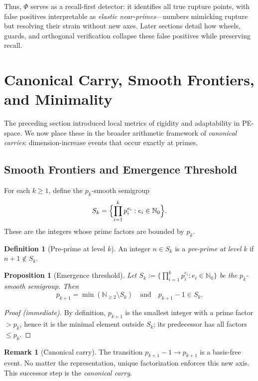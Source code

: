 \documentclass[11pt]{article}
\theoremstyle{plain}
\newtheorem{proposition}{Proposition}
\theoremstyle{definition}
\newtheorem{definition}{Definition}
\newtheorem{remark}{Remark}
\newcommand{\N}{\mathbb{N}}
\newcommand{\phidet}{\Phi}                                  %
\begin{document}
Thus, $\phidet$ serves as a recall-first detector: it identifies all true rupture points, with false positives interpretable as \emph{elastic near-primes}—numbers mimicking rupture but resolving their strain without new axes.  
Later sections detail how wheels, guards, and orthogonal verification collapse these false positives while preserving recall.

\section{Canonical Carry, Smooth Frontiers, and Minimality}

The preceding section introduced local metrics of rigidity and adaptability in PE-space. We now place these in the broader arithmetic framework of \emph{canonical carries}: dimension-increase events that occur exactly at primes.

\subsection{Smooth Frontiers and Emergence Threshold}
For each $k \geq 1$, define the $p_k$-smooth semigroup
\[
S_k = \Bigl\{ \prod_{i=1}^k p_i^{e_i} : e_i \in \N_0 \Bigr\}.
\]
These are the integers whose prime factors are bounded by $p_k$.  

\begin{definition}[Pre-prime at level $k$]
An integer $n \in S_k$ is a \emph{pre-prime at level $k$} if $n+1 \notin S_k$.
\end{definition}

\begin{proposition}[Emergence threshold]
Let $S_k:=\{\prod_{i=1}^k p_i^{e_i}: e_i\in\N_0\}$ be the $p_k$-smooth semigroup. Then
\[
p_{k+1}=\min(\N_{\ge 2}\setminus S_k)\quad\text{and}\quad p_{k+1}-1\in S_k.
\]
\end{proposition}
\begin{proof}[Proof (immediate)]
By definition, $p_{k+1}$ is the smallest integer with a prime factor $>p_k$, hence it is the minimal element outside $S_k$; its predecessor has all factors $\le p_k$.
\end{proof}


\begin{remark}[Canonical carry]
The transition $p_{k+1}-1 \to p_{k+1}$ is a basis-free event. No matter the representation, unique factorization enforces this new axis. This successor step is the \emph{canonical carry}.
\end{remark}
\end{document}
